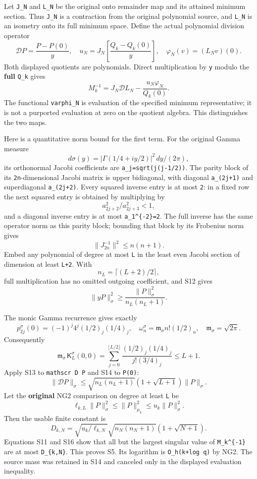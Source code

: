 Let \texttt{J\_N} and \texttt{L\_N} be the original onto remainder map and its attained minimum section. Thus \texttt{J\_N} is a contraction from the original polynomial source, and \texttt{L\_N} is an isometry onto its full minimum space. Define the actual polynomial division operator \[
 \mathscr D P=\frac{P-P(0)}y,
 \quad u_N=J_N\left[\frac{Q_k-Q_k(0)}y\right],\quad
 \varphi_N(v)=(L_Nv)(0).
\] Both displayed quotients are polynomials. Direct multiplication by \texttt{y} modulo the \textbf{full} \texttt{Q\_k} gives \[
 \boxed{M_k^{-1}=J_N\mathscr D L_N-\frac{u_N\varphi_N}{Q_k(0)}.}     \tag{S11}
\] The functional \texttt{varphi\_N} is evaluation of the specified minimum representative; it is not a purported evaluation at zero on the quotient algebra. This distinguishes the two maps.

Here is a quantitative norm bound for the first term. For the original Gamma measure \[
 d\sigma(y)=|\Gamma(1/4+iy/2)|^2\,dy/(2\pi),
\] its orthonormal Jacobi coefficients are \nolinkurl{a_j=sqrt(j(j-1/2))}. The parity block of its \texttt{2n}-dimensional Jacobi matrix is upper bidiagonal, with diagonal \texttt{a\_(2j+1)} and superdiagonal \texttt{a\_(2j+2)}. Every squared inverse entry is at most \texttt{2}: in a fixed row the next squared entry is obtained by multiplying by \[
 a_{2j+2}^2/a_{2j+3}^2<1,
\] and a diagonal inverse entry is at most \texttt{a\_1\^{}\{-2\}=2}. The full inverse has the same operator norm as this parity block; bounding that block by its Frobenius norm gives \[
 \|J_{2n}^{-1}\|^2\le n(n+1).                                     \tag{S12}
\] Embed any polynomial of degree at most \texttt{L} in the least even Jacobi section of dimension at least \texttt{L+2}. With \[
 n_L=\lceil(L+2)/2\rceil,
\] full multiplication has no omitted outgoing coefficient, and S12 gives \[
 \|yP\|_\sigma^2\ge\frac{\|P\|_\sigma^2}{n_L(n_L+1)}.             \tag{S13}
\]

The monic Gamma recurrence gives exactly \[
 p_{2j}^{\sigma}(0)=(-1)^j4^j(1/2)_j(1/4)_j,\quad
 \omega_n^\sigma=\mathfrak m_\sigma n!(1/2)_n,
 \quad\mathfrak m_\sigma=\sqrt{2\pi}.
\] Consequently \[
 \mathfrak m_\sigma\,\mathsf K_L^{\sigma}(0,0)
 =\sum_{j=0}^{\lfloor L/2\rfloor}
 \frac{(1/2)_j(1/4)_j}{j!(3/4)_j}\le L+1.                          \tag{S14}
\] Apply S13 to \texttt{mathscr\ D\ P} and S14 to \texttt{P(0)}: \[
 \|\mathscr D P\|_\sigma
 \le\sqrt{n_L(n_L+1)}(1+\sqrt{L+1})\|P\|_\sigma.                  \tag{S15}
\] Let the \textbf{original} NG2 comparison on degree at least \texttt{L} be \[
 \ell_{k,L}\|P\|_\sigma^2\le\|P\|_{\mu_k}^2\le u_k\|P\|_\sigma^2.
\] Then the usable finite constant is \[
 \boxed{D_{k,N}
 =\sqrt{u_k/\ell_{k,N}}\sqrt{n_N(n_N+1)}(1+\sqrt{N+1}).}           \tag{S16}
\] Equations S11 and S16 show that all but the largest singular value of \texttt{M\_k\^{}\{-1\}} are at most \texttt{D\_\{k,N\}}. This proves S5. Its logarithm is \texttt{O\_h(k+log\ q)} by NG2. The source mass was retained in S14 and canceled only in the displayed evaluation inequality.

